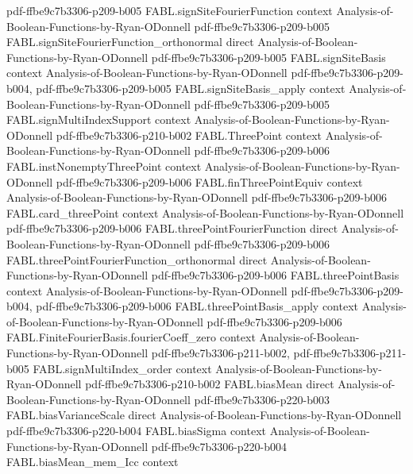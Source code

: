 \begin{theorem}
  {pdf-ffbe9c7b3306-p209-b005}
\proofstep
  {FABL.signSiteFourierFunction}
  {context}
  {Analysis-of-Boolean-Functions-by-Ryan-ODonnell}
  {pdf-ffbe9c7b3306-p209-b005}
\proofstep
  {FABL.signSiteFourierFunction_orthonormal}
  {direct}
  {Analysis-of-Boolean-Functions-by-Ryan-ODonnell}
  {pdf-ffbe9c7b3306-p209-b005}
\proofstep
  {FABL.signSiteBasis}
  {context}
  {Analysis-of-Boolean-Functions-by-Ryan-ODonnell}
  {pdf-ffbe9c7b3306-p209-b004,
    pdf-ffbe9c7b3306-p209-b005}
\proofstep
  {FABL.signSiteBasis_apply}
  {context}
  {Analysis-of-Boolean-Functions-by-Ryan-ODonnell}
  {pdf-ffbe9c7b3306-p209-b005}
\proofstep
  {FABL.signMultiIndexSupport}
  {context}
  {Analysis-of-Boolean-Functions-by-Ryan-ODonnell}
  {pdf-ffbe9c7b3306-p210-b002}
\proofstep
  {FABL.ThreePoint}
  {context}
  {Analysis-of-Boolean-Functions-by-Ryan-ODonnell}
  {pdf-ffbe9c7b3306-p209-b006}
\proofstep
  {FABL.instNonemptyThreePoint}
  {context}
  {Analysis-of-Boolean-Functions-by-Ryan-ODonnell}
  {pdf-ffbe9c7b3306-p209-b006}
\proofstep
  {FABL.finThreePointEquiv}
  {context}
  {Analysis-of-Boolean-Functions-by-Ryan-ODonnell}
  {pdf-ffbe9c7b3306-p209-b006}
\proofstep
  {FABL.card_threePoint}
  {context}
  {Analysis-of-Boolean-Functions-by-Ryan-ODonnell}
  {pdf-ffbe9c7b3306-p209-b006}
\proofstep
  {FABL.threePointFourierFunction}
  {direct}
  {Analysis-of-Boolean-Functions-by-Ryan-ODonnell}
  {pdf-ffbe9c7b3306-p209-b006}
\proofstep
  {FABL.threePointFourierFunction_orthonormal}
  {direct}
  {Analysis-of-Boolean-Functions-by-Ryan-ODonnell}
  {pdf-ffbe9c7b3306-p209-b006}
\proofstep
  {FABL.threePointBasis}
  {context}
  {Analysis-of-Boolean-Functions-by-Ryan-ODonnell}
  {pdf-ffbe9c7b3306-p209-b004,
    pdf-ffbe9c7b3306-p209-b006}
\proofstep
  {FABL.threePointBasis_apply}
  {context}
  {Analysis-of-Boolean-Functions-by-Ryan-ODonnell}
  {pdf-ffbe9c7b3306-p209-b006}
\proofstep
  {FABL.FiniteFourierBasis.fourierCoeff_zero}
  {context}
  {Analysis-of-Boolean-Functions-by-Ryan-ODonnell}
  {pdf-ffbe9c7b3306-p211-b002,
    pdf-ffbe9c7b3306-p211-b005}
\proofstep
  {FABL.signMultiIndex_order}
  {context}
  {Analysis-of-Boolean-Functions-by-Ryan-ODonnell}
  {pdf-ffbe9c7b3306-p210-b002}
\proofstep
  {FABL.biasMean}
  {direct}
  {Analysis-of-Boolean-Functions-by-Ryan-ODonnell}
  {pdf-ffbe9c7b3306-p220-b003}
\proofstep
  {FABL.biasVarianceScale}
  {direct}
  {Analysis-of-Boolean-Functions-by-Ryan-ODonnell}
  {pdf-ffbe9c7b3306-p220-b004}
\proofstep
  {FABL.biasSigma}
  {context}
  {Analysis-of-Boolean-Functions-by-Ryan-ODonnell}
  {pdf-ffbe9c7b3306-p220-b004}
\proofstep
  {FABL.biasMean_mem_Icc}
  {context}

\end{theorem}
